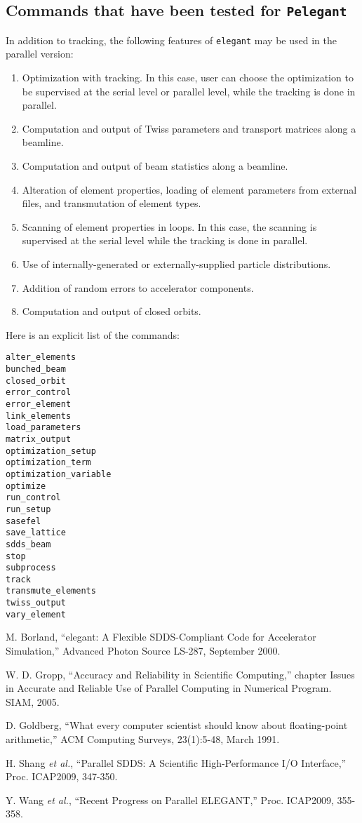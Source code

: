 \documentclass[11pt]{article}
\begin{document}
\subsection{Commands that have been tested for {\tt Pelegant}}
In addition to tracking, the following features of {\tt elegant} may be used in the parallel version:
\begin{enumerate}
\item Optimization with tracking.  In this case, user can choose the optimization to be supervised at the serial level or parallel level, while the tracking is done in parallel.
\item Computation and output of Twiss parameters and transport matrices along a beamline.
\item Computation and output of beam statistics along a beamline.
\item Alteration of element properties, loading of element parameters from external files, and transmutation of element types.
\item Scanning of element properties in loops.  In this case, the scanning is supervised at the serial level while the tracking is done in parallel.
\item Use of internally-generated or externally-supplied particle distributions.
\item Addition of random errors to accelerator components.
\item Computation and output of closed orbits.
\end{enumerate}

Here is an explicit list of the commands:\\
\begin{verbatim}
alter_elements
bunched_beam
closed_orbit
error_control
error_element
link_elements
load_parameters
matrix_output
optimization_setup
optimization_term
optimization_variable
optimize
run_control
run_setup
sasefel
save_lattice
sdds_beam
stop
subprocess
track
transmute_elements
twiss_output
vary_element
\end{verbatim}

\begin{thebibliography}{99}

  M. Borland, ``elegant: A Flexible SDDS-Compliant Code for Accelerator Simulation,''
  Advanced Photon Source LS-287, September 2000.

W. D. Gropp, ``Accuracy and Reliability in Scientific Computing,'' chapter
Issues           in Accurate and Reliable Use of Parallel Computing in
Numerical Program. SIAM,        2005.

D. Goldberg, ``What every computer scientist should know about
floating-point              arithmetic,'' ACM Computing Surveys, 23(1):5-48,
March 1991.

H. Shang {\em et al.}, ``Parallel SDDS: A Scientific High-Performance I/O Interface,'' Proc. ICAP2009, 347-350.

Y. Wang {\em et al.}, ``Recent Progress on Parallel ELEGANT,'' Proc. ICAP2009, 355-358.

\end{thebibliography}
\end{document}
